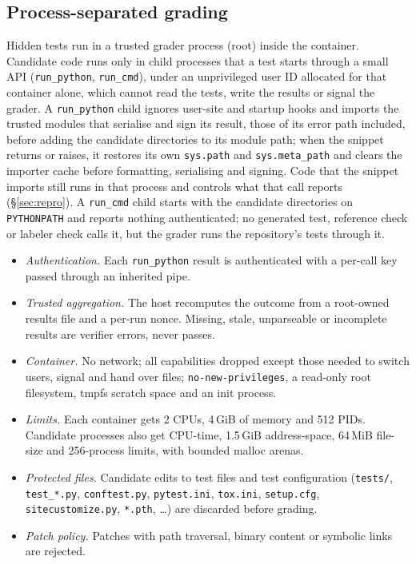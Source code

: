 \subsection{Process-separated grading}
\label{sec:grading}
Hidden tests run in a trusted grader process (root) inside the container. Candidate code runs only in child processes that a test starts through a small API (\texttt{run\_python}, \texttt{run\_cmd}), under an unprivileged user ID allocated for that container alone, which cannot read the tests, write the results or signal the grader. A \texttt{run\_python} child ignores user-site and startup hooks and imports the trusted modules that serialise and sign its result, those of its error path included, before adding the candidate directories to its module path; when the snippet returns or raises, it restores its own \texttt{sys.path} and \texttt{sys.meta\_path} and clears the importer cache before formatting, serialising and signing. Code that the snippet imports still runs in that process and controls what that call reports (\S\ref{sec:repro}). A \texttt{run\_cmd} child starts with the candidate directories on \texttt{PYTHONPATH} and reports nothing authenticated; no generated test, reference check or labeler check calls it, but the grader runs the repository's tests through it.
\begin{itemize}
\item \emph{Authentication.} Each \texttt{run\_python} result is authenticated with a per-call key passed through an inherited pipe.
\item \emph{Trusted aggregation.} The host recomputes the outcome from a root-owned results file and a per-run nonce. Missing, stale, unparseable or incomplete results are verifier errors, never passes.
\item \emph{Container.} No network; all capabilities dropped except those needed to switch users, signal and hand over files; \texttt{no-new-privileges}, a read-only root filesystem, tmpfs scratch space and an init process.
\item \emph{Limits.} Each container gets 2 CPUs, 4\,GiB of memory and 512 PIDs. Candidate processes also get CPU-time, 1.5\,GiB address-space, 64\,MiB file-size and 256-process limits, with bounded malloc arenas.
\item \emph{Protected files.} Candidate edits to test files and test configuration (\texttt{tests/}, \texttt{test\_*.py}, \texttt{conftest.py}, \texttt{pytest.ini}, \texttt{tox.ini}, \texttt{setup.cfg}, \texttt{sitecustomize.py}, \texttt{*.pth}, \dots) are discarded before grading.
\item \emph{Patch policy.} Patches with path traversal, binary content or symbolic links are rejected.
\end{itemize}
